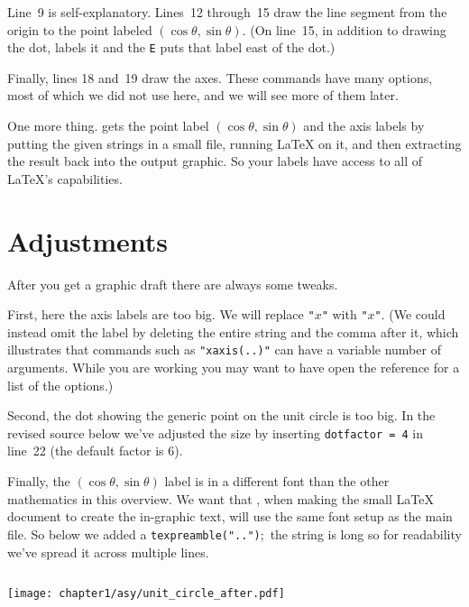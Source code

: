 Line~9 is self-explanatory.
Lines~12 through~15 draw the line segment from the origin to the 
point labeled $(\cos\theta,\sin\theta)$.
(On line~15, in addition to drawing the dot, \Asy{} labels it and
the \texttt{E} puts that label east of the dot.)

Finally, lines 18 and~19 draw the axes.
These commands have many options, most of which we did not use here,
and we will see more of them later.

One more thing.
\Asy{} gets the point label $(\cos\theta,\sin\theta)$ and the axis labels
by putting the given strings in a small file,
running \LaTeX{} on it, and then extracting the result back into the
output graphic.
So your labels have access to all of \LaTeX's capabilities.  





\section{Adjustments}
After you get a graphic draft there are always some tweaks.

First, here the axis labels are too big.
We will replace \texttt{"$x$"}
with \texttt{"\scriptsize $x$"}.
(We could instead omit the label by deleting the entire
string and the comma after it,
which illustrates that commands
such as \texttt{"xaxis(..)"}
can have a variable number of arguments.
While you are working you may want to have open the \Asy{} reference
for a list of the options.)

Second, the dot showing the generic point on the unit circle is too big.
In the revised source below we've adjusted the size by inserting
\texttt{dotfactor = 4} in line~22
(the default factor is $6$).

Finally, the $(\cos\theta,\sin\theta)$ label is in a different font than
the other mathematics in this overview.
We want that \Asy, when making the small \LaTeX{} document to create the
in-graphic text,
will use the same font setup as the main  file.
So below we added a 
\texttt{texpreamble("..")};~the 
string is long so for readability we've spread it across multiple lines.
\begin{center}
  \inputminted{Asymptote}{chapter1/asy/unit_circle_after.asy}
\end{center}
\begin{center}
  \texttt{[image: chapter1/asy/unit\_circle\_after.pdf]}
\end{center}




